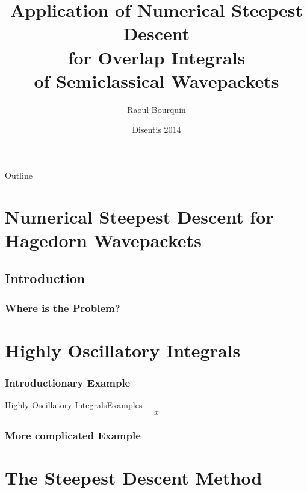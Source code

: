\documentclass{beamer}
\title[Wavepackets]{Application of Numerical Steepest Descent \\
                    for Overlap Integrals \\
                    of Semiclassical Wavepackets}
\author[]{Raoul Bourquin}
\date{Disentis 2014}
\begin{document}
\begin{frame}
  \titlepage
\end{frame}

\begin{frame}{Outline}
  \tableofcontents
\end{frame}

\section{Numerical Steepest Descent for Hagedorn Wavepackets}

\subsection{Introduction}
\subsubsection{Where is the Problem?}


\section{Highly Oscillatory Integrals}
\subsubsection{Introductionary Example}



\begin{frame}{Highly Oscillatory Integrals}{Examples}
  \begin{equation}
    x
  \end{equation}
\end{frame}



\subsubsection{More complicated Example}



\section{The Steepest Descent Method}

\end{document}

